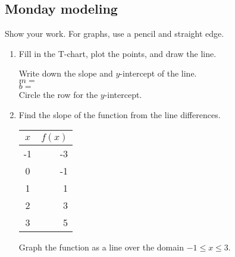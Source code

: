 \documentclass[12pt, oneside]{article}
\begin{document}
\subsection*{Monday modeling}
Show your work. For graphs, use a pencil and straight edge.
  \begin{enumerate}

\subsubsection*{Graphing linear functions}
\item Fill in the T-chart, plot the points, and draw the line.

    \begin{center} %
    \end{center}
Write down the slope and $y$-intercept of the line.\\ \bigskip
$m=$\\ \bigskip
$b=$\\ \vspace{2cm}
Circle the row for the $y$-intercept.
\newpage

\item Find the slope of the function from the line differences.
    \begin{center}
      \begin{tabular}{|c|r|}
      \hline
      $x$ & $f(x)$\\
      \hline
      -1 & -3 \\
      \hline
      0 & -1 \\
      \hline
      1 & 1 \\
      \hline
      2 & 3 \\
      \hline
      3 & 5 \\
      \hline
      \end{tabular}
    \end{center}
Graph the function as a line over the domain $-1 \leq x \leq 3$.

\begin{center} %
\end{center}



\end{enumerate}
\end{document}

